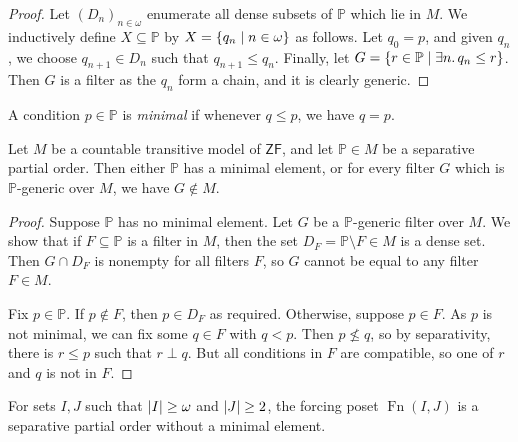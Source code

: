 \begin{proof}
    Let \( (D_n)_{n \in \omega} \) enumerate all dense subsets of \( \mathbb P \) which lie in \( M \).
    We inductively define \( X \subseteq \mathbb P \) by \( X = \qty{q_n \mid n \in \omega} \) as follows.
    Let \( q_0 = p \), and given \( q_n \), we choose \( q_{n+1} \in D_n \) such that \( q_{n+1} \leq q_n \).
    Finally, let \( G = \qty{r \in \mathbb P \mid \exists n.\, q_n \leq r} \).
    Then \( G \) is a filter as the \( q_n \) form a chain, and it is clearly generic.
\end{proof}
\begin{definition}
    A condition \( p \in \mathbb P \) is \emph{minimal} if whenever \( q \leq p \), we have \( q = p \).
\end{definition}
\begin{lemma}
    Let \( M \) be a countable transitive model of \( \mathsf{ZF} \), and let \( \mathbb P \in M \) be a separative partial order.
    Then either \( \mathbb P \) has a minimal element, or for every filter \( G \) which is \( \mathbb P \)-generic over \( M \), we have \( G \notin M \).
\end{lemma}
\begin{proof}
    Suppose \( \mathbb P \) has no minimal element.
    Let \( G \) be a \( \mathbb P \)-generic filter over \( M \).
    We show that if \( F \subseteq \mathbb P \) is a filter in \( M \), then the set \( D_F = \mathbb P \setminus F \in M \) is a dense set.
    Then \( G \cap D_F \) is nonempty for all filters \( F \), so \( G \) cannot be equal to any filter \( F \in M \).

    Fix \( p \in \mathbb P \).
    If \( p \notin F \), then \( p \in D_F \) as required.
    Otherwise, suppose \( p \in F \).
    As \( p \) is not minimal, we can fix some \( q \in F \) with \( q < p \).
    Then \( p \nleq q \), so by separativity, there is \( r \leq p \) such that \( r \perp q \).
    But all conditions in \( F \) are compatible, so one of \( r \) and \( q \) is not in \( F \).
\end{proof}
\begin{proposition}
    For sets \( I, J \) such that \( \abs{I} \geq \omega \) and \( \abs{J} \geq 2 \), the forcing poset \( \operatorname{Fn}(I, J) \) is a separative partial order without a minimal element.
\end{proposition}
